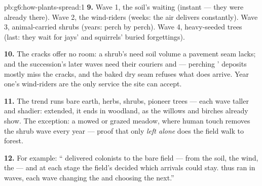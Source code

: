 \begin{solution}{pb:g6:how-plants-spread:1}
\textbf{9.} Wave 1, the soil's waiting  (instant ---
they were already there). Wave 2, the wind-riders (weeks:
the air delivers constantly). Wave 3, animal-carried shrubs
(years: perch by perch). Wave 4, heavy-seeded trees (last:
they wait for jays' and squirrels' buried forgettings).

\textbf{10.} The cracks offer no room: a shrub's  need
soil volume a pavement seam lacks; and the succession's
later waves need their couriers and  --- perching
' deposits mostly miss the cracks, and the baked dry
seam refuses what does arrive. Year one's wind-riders are
the only service the site can accept.

\textbf{11.} The trend runs bare earth, herbs, shrubs,
pioneer trees --- each wave taller and shadier: extended,
it ends in woodland, as the willows and birches already
show. The exception: a mowed or grazed meadow, where human
touch removes the shrub wave every year --- proof that only
\emph{left alone} does the field walk to forest.

\textbf{12.} For example: `` delivered colonists to
the bare field --- from the soil, the wind, the  ---
and at each stage the field's  decided which
arrivals could stay.  thus ran in waves, each
wave changing the  and choosing the next.''
\end{solution}
